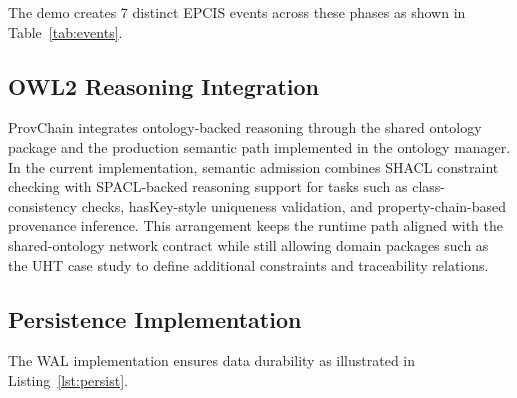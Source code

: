 \documentclass[preprint,review,12pt,authoryear]{elsarticle}
\begin{document}
The demo creates 7 distinct EPCIS events across these phases as shown in Table~\ref{tab:events}.

\begin{table}[htbp]
\centering
\caption{EPCIS Events in UHT Demo}
\label{tab:events}
\end{table}

\subsection{OWL2 Reasoning Integration}

ProvChain integrates ontology-backed reasoning through the shared ontology package and the production semantic path implemented in the ontology manager. In the current implementation, semantic admission combines SHACL constraint checking with SPACL-backed reasoning support for tasks such as class-consistency checks, hasKey-style uniqueness validation, and property-chain-based provenance inference. This arrangement keeps the runtime path aligned with the shared-ontology network contract while still allowing domain packages such as the UHT case study to define additional constraints and traceability relations.

\subsection{Persistence Implementation}

The WAL implementation ensures data durability as illustrated in Listing~\ref{lst:persist}.
\end{document}
